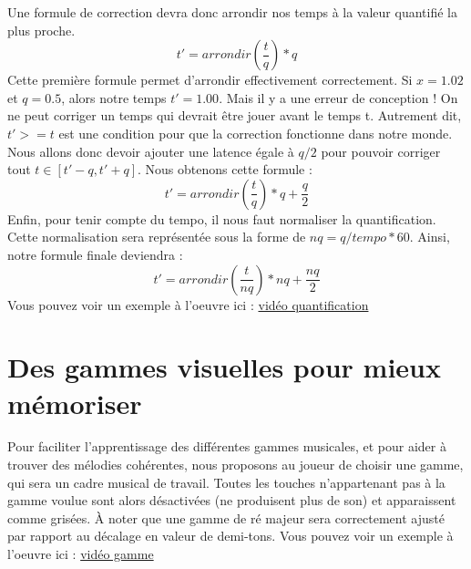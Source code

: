 \documentclass{article}
\begin{document}
Une formule de correction devra donc arrondir nos temps à la valeur quantifié la plus proche.
\begin{equation}
    t' = arrondir(\frac{t}{q}) * q
\end{equation}
Cette première formule permet d'arrondir effectivement correctement. Si $x = 1.02$ et $q = 0.5$, alors notre temps $t' = 1.00$.
\newline
\newline
Mais il y a une erreur de conception ! On ne peut corriger un temps qui devrait être jouer avant le temps t. Autrement dit, $t' >= t$ est une condition pour que la correction fonctionne dans notre monde. Nous allons donc devoir ajouter une latence égale à $q/2$ pour pouvoir corriger tout $t \in [t'-q, t'+q]$. Nous obtenons cette formule :
\newline
\newline
\begin{equation}
    t' = arrondir(\frac{t}{q}) * q + \frac{q}{2}
\end{equation}
\newline
\newline
Enfin, pour tenir compte du tempo, il nous faut normaliser la quantification. Cette normalisation sera représentée sous la forme de $nq = q / tempo * 60$.
Ainsi, notre formule finale deviendra :
\begin{equation}
    t' = arrondir(\frac{t}{nq}) * nq + \frac{nq}{2}
\end{equation}
\newline
\newline
Vous pouvez voir un exemple à l'oeuvre ici : \href{https://www.youtube.com/watch?v=u1Y226gDEoo&list=PLvsOC5PoBqO5ggNxiqPKSkO_ZL5-JctbU&index=2}{vidéo quantification}

\section{Des gammes visuelles pour mieux mémoriser}

Pour faciliter l'apprentissage des différentes gammes musicales, et pour aider à trouver des mélodies cohérentes, nous proposons au joueur de choisir une gamme, qui sera un cadre musical de travail. Toutes les touches n'appartenant pas à la gamme voulue sont alors désactivées (ne produisent plus de son) et apparaissent comme grisées.
\newline
\newline
À noter que une gamme de ré majeur sera correctement ajusté par rapport au décalage en valeur de demi-tons.
\newline
\newline
Vous pouvez voir un exemple à l'oeuvre ici : \href{https://www.youtube.com/watch?v=C232B-3eK2Y&list=PLvsOC5PoBqO5ggNxiqPKSkO_ZL5-JctbU&index=4}{vidéo gamme}
\end{document}
